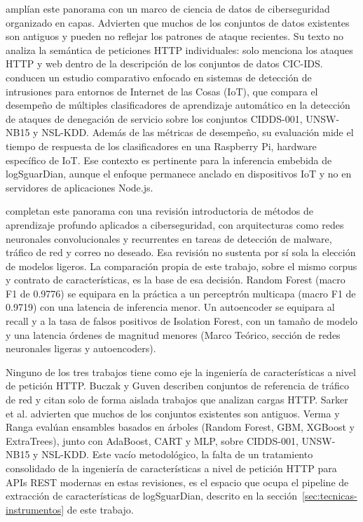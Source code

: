 \textcite{sarker2020} amplían este panorama con un marco de ciencia de datos de ciberseguridad organizado en capas. Advierten que muchos de los conjuntos de datos existentes son antiguos y pueden no reflejar los patrones de ataque recientes. Su texto no analiza la semántica de peticiones HTTP individuales: solo menciona los ataques HTTP y web dentro de la descripción de los conjuntos de datos CIC-IDS. \textcite{verma2020} conducen un estudio comparativo enfocado en sistemas de detección de intrusiones para entornos de Internet de las Cosas (IoT), que compara el desempeño de múltiples clasificadores de aprendizaje automático en la detección de ataques de denegación de servicio sobre los conjuntos CIDDS-001, UNSW-NB15 y NSL-KDD. Además de las métricas de desempeño, su evaluación mide el tiempo de respuesta de los clasificadores en una Raspberry Pi, hardware específico de IoT. Ese contexto es pertinente para la inferencia embebida de logSguarDian, aunque el enfoque permanece anclado en dispositivos IoT y no en servidores de aplicaciones Node.js.

\textcite{berman2019} completan este panorama con una revisión introductoria de métodos de aprendizaje profundo aplicados a ciberseguridad, con arquitecturas como redes neuronales convolucionales y recurrentes en tareas de detección de malware, tráfico de red y correo no deseado. Esa revisión no sustenta por sí sola la elección de modelos ligeros. La comparación propia de este trabajo, sobre el mismo corpus y contrato de características, es la base de esa decisión. Random Forest (macro F1 de 0.9776) se equipara en la práctica a un perceptrón multicapa (macro F1 de 0.9719) con una latencia de inferencia menor. Un autoencoder se equipara al recall y a la tasa de falsos positivos de Isolation Forest, con un tamaño de modelo y una latencia órdenes de magnitud menores (Marco Teórico, sección de redes neuronales ligeras y autoencoders).

Ninguno de los tres trabajos tiene como eje la ingeniería de características a nivel de petición HTTP. Buczak y Guven \cite{buczak2016} describen conjuntos de referencia de tráfico de red y citan solo de forma aislada trabajos que analizan cargas HTTP. Sarker et al. \cite{sarker2020} advierten que muchos de los conjuntos existentes son antiguos. Verma y Ranga \cite{verma2020} evalúan ensambles basados en árboles (Random Forest, GBM, XGBoost y ExtraTrees), junto con AdaBoost, CART y MLP, sobre CIDDS-001, UNSW-NB15 y NSL-KDD. Este vacío metodológico, la falta de un tratamiento consolidado de la ingeniería de características a nivel de petición HTTP para APIs REST modernas en estas revisiones, es el espacio que ocupa el pipeline de extracción de características de logSguarDian, descrito en la sección~\ref{sec:tecnicas-instrumentos} de este trabajo.

